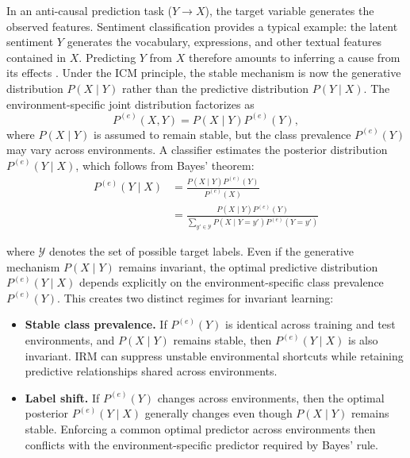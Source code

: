 \documentclass[11pt]{article}
\theoremstyle{definition}
\theoremstyle{plain}
\begin{document}
In an anti-causal prediction task ($Y\rightarrow X$), the target variable generates the observed features. Sentiment classification provides a typical example: the latent sentiment $Y$ generates the vocabulary, expressions, and other textual features contained in $X$. Predicting $Y$ from $X$ therefore amounts to inferring a cause from its effects \citep{jin-etal-2021-causal, feder2022causal}. Under the ICM principle, the stable mechanism is now the generative distribution $P(X\mid Y)$ rather than the predictive distribution $P(Y\mid X)$. The environment-specific joint distribution factorizes as
\begin{equation}
P^{(e)}(X,Y) = P(X\mid Y)P^{(e)}(Y),
\label{eq:anticausal-factorization}
\end{equation}
where $P(X\mid Y)$ is assumed to remain stable, but the class prevalence $P^{(e)}(Y)$ may vary across environments. A classifier estimates the posterior distribution $P^{(e)}(Y\mid X)$, which follows from Bayes' theorem:
\begin{equation}
\begin{aligned}
P^{(e)}(Y \mid X) &= \frac{P(X \mid Y)P^{(e)}(Y)} {P^{(e)}(X)} \\[3pt] &= \frac{P(X \mid Y)P^{(e)}(Y)} {\displaystyle \sum_{y' \in \mathcal{Y}} P(X \mid Y=y')P^{(e)}(Y=y')}
\end{aligned}
\label{eq:bayes}
\end{equation}

where $\mathcal{Y}$ denotes the set of possible target labels. Even if the generative mechanism $P(X\mid Y)$ remains invariant, the optimal predictive distribution $P^{(e)}(Y\mid X)$ depends explicitly on the environment-specific class prevalence $P^{(e)}(Y)$. This creates two distinct regimes for invariant learning:
\begin{itemize}
    \item \textbf{Stable class prevalence.} If $P^{(e)}(Y)$ is identical across training and test environments, and $P(X\mid Y)$ remains stable, then $P^{(e)}(Y\mid X)$ is also invariant. IRM can suppress unstable environmental shortcuts while retaining predictive relationships shared across environments.
    \item \textbf{Label shift.} If $P^{(e)}(Y)$ changes across environments, then the optimal posterior $P^{(e)}(Y\mid X)$ generally changes even though $P(X\mid Y)$ remains stable. Enforcing a common optimal predictor across environments then conflicts with the environment-specific predictor required by Bayes' rule.
\end{itemize}
\end{document}

